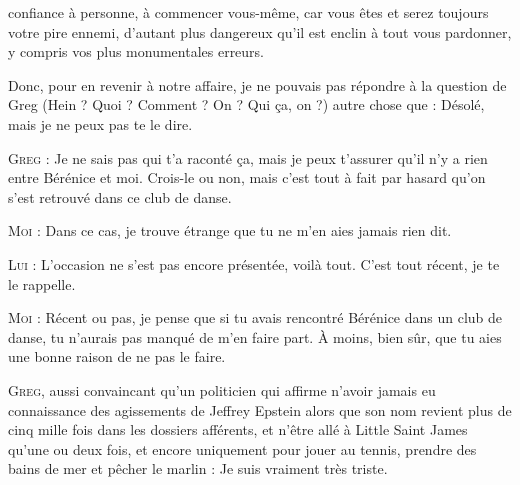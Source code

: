 confiance à personne, à commencer vous-même, car vous êtes et serez toujours votre pire ennemi, d’autant plus dangereux qu’il est enclin à tout vous pardonner, y compris vos plus monumentales erreurs.

\begin{dialogue}

Donc, pour en revenir à notre affaire, je ne pouvais pas répondre à la question de Greg (Hein ? Quoi ? Comment ? On ? Qui ça, on ?) autre chose que : Désolé, mais je ne peux pas te le dire.

\textsc{Greg} : Je ne sais pas qui t’a raconté ça, mais je peux t’assurer qu’il n’y a rien entre Bérénice et moi. Crois-le ou non, mais c’est tout à fait par hasard qu’on s’est retrouvé dans ce club de danse.

\textsc{Moi} : Dans ce cas, je trouve étrange que tu ne m’en aies jamais rien dit.

\textsc{Lui} : L’occasion ne s’est pas encore présentée, voilà tout. C’est tout récent, je te le rappelle.

\textsc{Moi} : Récent ou pas, je pense que si tu avais rencontré Bérénice dans un club de danse, tu n’aurais pas manqué de m’en faire part. À moins, bien sûr, que tu aies une bonne raison de ne pas le faire.

%

\textsc{Greg}, aussi convaincant qu’un politicien qui affirme n’avoir jamais eu connaissance des agissements de Jeffrey Epstein alors que son nom revient plus de cinq mille fois dans les dossiers afférents, et n’être allé à Little Saint James qu’une ou deux fois, et encore uniquement pour jouer au tennis, prendre des bains de mer et pêcher le marlin : Je suis vraiment très triste.


\end{dialogue}
